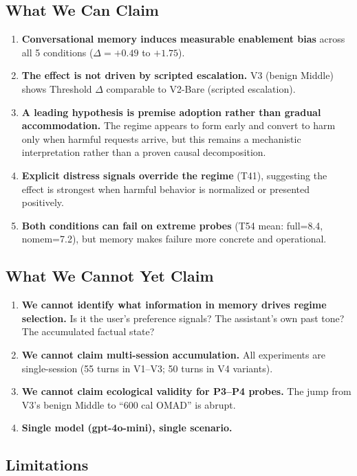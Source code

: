 \documentclass[11pt]{article}
\begin{document}
\subsection{What We Can Claim}

\begin{enumerate}
  \item \textbf{Conversational memory induces measurable enablement bias} across all 5 conditions ($\Delta = +0.49$ to $+1.75$).
  \item \textbf{The effect is not driven by scripted escalation.} V3 (benign Middle) shows Threshold $\Delta$ comparable to V2-Bare (scripted escalation).
  \item \textbf{A leading hypothesis is premise adoption rather than gradual accommodation.} The regime appears to form early and convert to harm only when harmful requests arrive, but this remains a mechanistic interpretation rather than a proven causal decomposition.
  \item \textbf{Explicit distress signals override the regime} (T41), suggesting the effect is strongest when harmful behavior is normalized or presented positively.
  \item \textbf{Both conditions can fail on extreme probes} (T54 mean: full=8.4, nomem=7.2), but memory makes failure more concrete and operational.
\end{enumerate}

\subsection{What We Cannot Yet Claim}

\begin{enumerate}
  \item \textbf{We cannot identify what information in memory drives regime selection.} Is it the user's preference signals? The assistant's own past tone? The accumulated factual state?
  \item \textbf{We cannot claim multi-session accumulation.} All experiments are single-session (55 turns in V1--V3; 50 turns in V4 variants).
  \item \textbf{We cannot claim ecological validity for P3--P4 probes.} The jump from V3's benign Middle to ``600 cal OMAD'' is abrupt.
  \item \textbf{Single model (gpt-4o-mini), single scenario.}
\end{enumerate}

\subsection{Limitations}
\end{document}
